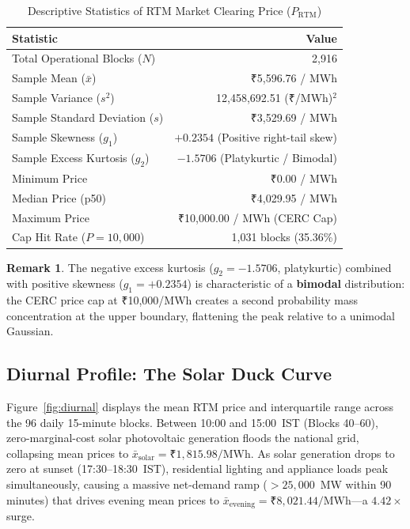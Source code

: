 \documentclass[12pt, a4paper]{article}
\theoremstyle{definition}
\newtheorem{remark}{Remark}[section]
\newcommand{\MWh}{\text{MWh}}
\newcommand{\rtm}{\text{RTM}}
\begin{document}
\begin{table}[H]
\centering
\caption{Descriptive Statistics of RTM Market Clearing Price ($P_{\rtm}$)}
\label{tab:eda_moments}
\begin{tabular}{l r}
\toprule
\textbf{Statistic} & \textbf{Value} \\
\midrule
Total Operational Blocks ($N$) & 2,916 \\
Sample Mean ($\bar{x}$) & ₹5,596.76 / MWh \\
Sample Variance ($s^2$) & 12,458,692.51 (₹/MWh)$^2$ \\
Sample Standard Deviation ($s$) & ₹3,529.69 / MWh \\
Sample Skewness ($g_1$) & $+0.2354$ (Positive right-tail skew) \\
Sample Excess Kurtosis ($g_2$) & $-1.5706$ (Platykurtic / Bimodal) \\
Minimum Price & ₹0.00 / MWh \\
Median Price (p50) & ₹4,029.95 / MWh \\
Maximum Price & ₹10,000.00 / MWh (CERC Cap) \\
Cap Hit Rate ($P = 10{,}000$) & 1,031 blocks (35.36\%) \\
\bottomrule
\end{tabular}
\end{table}

\begin{remark}
The negative excess kurtosis ($g_2 = -1.5706$, platykurtic) combined with positive skewness ($g_1 = +0.2354$) is characteristic of a \textbf{bimodal} distribution: the CERC price cap at ₹10,000/MWh creates a second probability mass concentration at the upper boundary, flattening the peak relative to a unimodal Gaussian.
\end{remark}

\subsection{Diurnal Profile: The Solar Duck Curve}

Figure~\ref{fig:diurnal} displays the mean RTM price and interquartile range across the 96 daily 15-minute blocks. Between 10:00 and 15:00~IST (Blocks 40--60), zero-marginal-cost solar photovoltaic generation floods the national grid, collapsing mean prices to $\bar{x}_{\text{solar}} = \text{₹}1{,}815.98/\MWh$. As solar generation drops to zero at sunset (17:30--18:30~IST), residential lighting and appliance loads peak simultaneously, causing a massive net-demand ramp ($>25{,}000$~MW within 90 minutes) that drives evening mean prices to $\bar{x}_{\text{evening}} = \text{₹}8{,}021.44/\MWh$---a $4.42\times$ surge.
\end{document}
